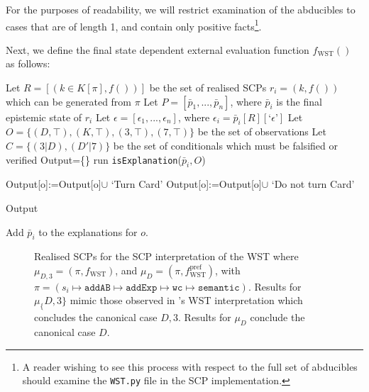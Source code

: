 For the purposes of readability, we will restrict examination of the abducibles to cases that are of length 1, and contain only positive facts\footnote{A reader wishing to see this process with respect to the full set of abducibles should examine the \texttt{WST.py} file in the SCP implementation.}.

Next, we define the final state dependent external evaluation function $f_\text{WST}()$ as follows:

\begin{algorithm}[H]
\SetAlgoLined
{}
{
Let $R=[(k \in K[\pi],f())]$ be the set of realised SCPs $r_i=(k,f())$ which can be generated from $\pi$\;
Let $P=[\bar{p}_1,...,\bar{p}_n]$, where $\bar{p}_i$ is the final epistemic state of $r_i$\;
Let $\epsilon=[\epsilon_1,...,\epsilon_n]$, where $\epsilon_i=\bar{p}_i[R][\text{`}\epsilon\text{'}]$\;
Let $O=\{(D,\top),(K,\top),(3,\top),(7,\top)\}$ be the set of observations\;
Let $C=\{(3|D), (D' | 7)\}$ be the set of conditionals which must be falsified or verified\;
Output=\{\}\;
{
run \texttt{isExplanation}($\bar{p}_i,O$)\;
}

{
{
Output[o]:=Output[o]$\cup$ `Turn Card'\;
}
\Else
{
Output[o]:=Output[o]$\cup$ `Do not turn Card'\;
}
}

\Return Output
}
{
{
{
Add $\bar{p}_i$ to the explanations for $o$.
}
}
}

\caption{$\texttt{f}_\text{WST}$}
 \label{f:wst}
\end{algorithm}

\begin{figure}

\caption{Realised SCPs for the SCP interpretation of the WST where $\mu_{D,3}=(\pi,f_\text{WST})$, and $\mu_D=(\pi,f_\text{WST}^\text{pref})$, with $\pi=(s_i \longmapsto \texttt{addAB} \longmapsto \texttt{addExp}  \longmapsto \texttt{wc} \longmapsto \texttt{semantic})$. Results for $\mu_\{D,3\}$ mimic those observed in \cite{holldobler2015weak}'s WST interpretation which concludes the canonical case $D,3$. Results for $\mu_{D}$ conclude the canonical case $D$. }
\label{fig:rSCP_WST}
\end{figure}


